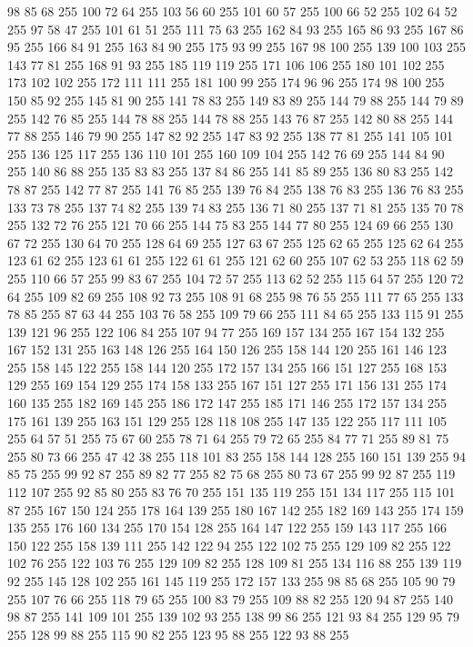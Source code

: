 98 85 68 255 100 72 64 255 103 56 60 255 101 60 57 255 100 66 52 255 102 64 52 255 97 58 47 255 101 61 51 255 111 75 63 255 162 84 93 255 165 86 93 255 167 86 95 255 166 84 91 255 163 84 90 255 175 93 99 255 167 98 100 255 139 100 103 255 143 77 81 255 168 91 93 255 185 119 119 255 171 106 106 255 180 101 102 255 173 102 102 255 172 111 111 255 181 100 99 255 174 96 96 255 174 98 100 255 150 85 92 255 145 81 90 255 141 78 83 255 149 83 89 255 144 79 88 255 144 79 89 255 142 76 85 255 144 78 88 255 144 78 88 255 143 76 87 255 142 80 88 255 144 77 88 255 146 79 90 255 147 82 92 255 147 83 92 255 138 77 81 255 141 105 101 255 136 125 117 255 136 110 101 255 160 109 104 255 142 76 69 255 144 84 90 255 140 86 88 255 135 83 83 255 137 84 86 255 141 85 89 255 136 80 83 255 142 78 87 255 142 77 87 255 141 76 85 255 139 76 84 255 138 76 83 255 136 76 83 255 133 73 78 255 137 74 82 255 139 74 83 255 136 71 80 255
137 71 81 255 135 70 78 255 132 72 76 255 121 70 66 255 144 75 83 255 144 77 80 255 124 69 66 255 130 67 72 255 130 64 70 255 128 64 69 255 127 63 67 255 125 62 65 255 125 62 64 255 123 61 62 255 123 61 61 255 122 61 61 255 121 62 60 255 107 62 53 255 118 62 59 255 110 66 57 255 99 83 67 255 104 72 57 255 113 62 52 255 115 64 57 255 120 72 64 255 109 82 69 255 108 92 73 255 108 91 68 255 98 76 55 255 111 77 65 255 133 78 85 255 87 63 44 255 103 76 58 255 109 79 66 255 111 84 65 255 133 115 91 255 139 121 96 255 122 106 84 255 107 94 77 255 169 157 134 255 167 154 132 255 167 152 131 255 163 148 126 255 164 150 126 255 158 144 120 255 161 146 123 255 158 145 122 255 158 144 120 255 172 157 134 255 166 151 127 255 168 153 129 255 169 154 129 255 174 158 133 255 167 151 127 255 171 156 131 255 174 160 135 255 182 169 145 255 186 172 147 255 185 171 146 255 172 157 134 255 175 161 139 255 163 151 129 255 128 118 108 255 147 135 122 255
117 111 105 255 64 57 51 255 75 67 60 255 78 71 64 255 79 72 65 255 84 77 71 255 89 81 75 255 80 73 66 255 47 42 38 255 118 101 83 255 158 144 128 255 160 151 139 255 94 85 75 255 99 92 87 255 89 82 77 255 82 75 68 255 80 73 67 255 99 92 87 255 119 112 107 255 92 85 80 255 83 76 70 255 151 135 119 255 151 134 117 255 115 101 87 255 167 150 124 255 178 164 139 255 180 167 142 255 182 169 143 255 174 159 135 255 176 160 134 255 170 154 128 255 164 147 122 255 159 143 117 255 166 150 122 255 158 139 111 255 142 122 94 255 122 102 75 255 129 109 82 255 122 102 76 255 122 103 76 255 129 109 82 255 128 109 81 255 134 116 88 255 139 119 92 255 145 128 102 255 161 145 119 255 172 157 133 255 98 85 68 255 105 90 79 255 107 76 66 255 118 79 65 255 100 83 79 255 109 88 82 255 120 94 87 255 140 98 87 255 141 109 101 255 139 102 93 255 138 99 86 255 121 93 84 255 129 95 79 255 128 99 88 255 115 90 82 255 123 95 88 255 122 93 88 255
